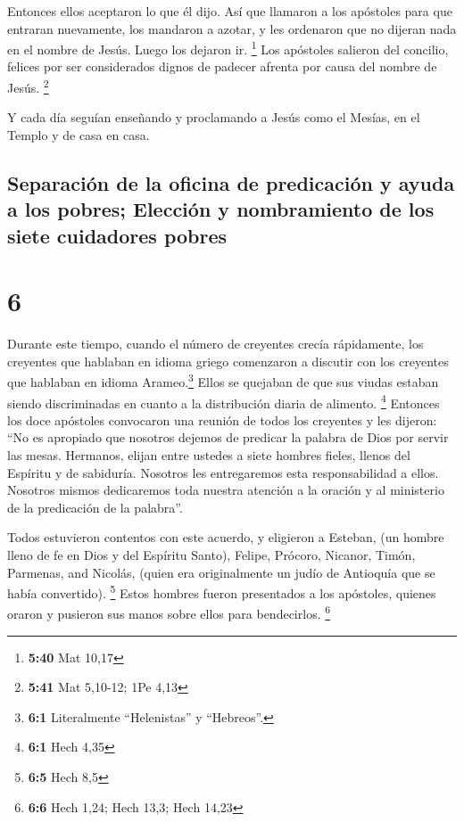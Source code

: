  Entonces ellos aceptaron lo que él dijo. Así que
llamaron a los apóstoles para que entraran nuevamente, los mandaron a
azotar, y les ordenaron que no dijeran nada en el nombre de Jesús. Luego
los dejaron ir. \footnote{\textbf{5:40} Mat 10,17}  Los
apóstoles salieron del concilio, felices por ser considerados dignos de
padecer afrenta por causa del nombre de Jesús. \footnote{\textbf{5:41}
  Mat 5,10-12; 1Pe 4,13}

 Y cada día seguían enseñando y proclamando a Jesús como
el Mesías, en el Templo y de casa en casa.

\hypertarget{separaciuxf3n-de-la-oficina-de-predicaciuxf3n-y-ayuda-a-los-pobres-elecciuxf3n-y-nombramiento-de-los-siete-cuidadores-pobres}{%
\subsection{Separación de la oficina de predicación y ayuda a los
pobres; Elección y nombramiento de los siete cuidadores
pobres}\label{separaciuxf3n-de-la-oficina-de-predicaciuxf3n-y-ayuda-a-los-pobres-elecciuxf3n-y-nombramiento-de-los-siete-cuidadores-pobres}}

\hypertarget{section-5}{%
\section{6}\label{section-5}}

 Durante este tiempo, cuando el número de creyentes crecía
rápidamente, los creyentes que hablaban en idioma griego comenzaron a
discutir con los creyentes que hablaban en idioma Arameo.\footnote{\textbf{6:1}
  Literalmente ``Helenistas'' y ``Hebreos''.} Ellos se quejaban de que
sus viudas estaban siendo discriminadas en cuanto a la distribución
diaria de alimento. \footnote{\textbf{6:1} Hech 4,35} 
Entonces los doce apóstoles convocaron una reunión de todos los
creyentes y les dijeron: ``No es apropiado que nosotros dejemos de
predicar la palabra de Dios por servir las mesas. 
Hermanos, elijan entre ustedes a siete hombres fieles, llenos del
Espíritu y de sabiduría. Nosotros les entregaremos esta responsabilidad
a ellos.  Nosotros mismos dedicaremos toda nuestra
atención a la oración y al ministerio de la predicación de la palabra''.

 Todos estuvieron contentos con este acuerdo, y eligieron
a Esteban, (un hombre lleno de fe en Dios y del Espíritu Santo), Felipe,
Prócoro, Nicanor, Timón, Parmenas, and Nicolás, (quien era originalmente
un judío de Antioquía que se había convertido). \footnote{\textbf{6:5}
  Hech 8,5}  Estos hombres fueron presentados a los
apóstoles, quienes oraron y pusieron sus manos sobre ellos para
bendecirlos. \footnote{\textbf{6:6} Hech 1,24; Hech 13,3; Hech 14,23}

